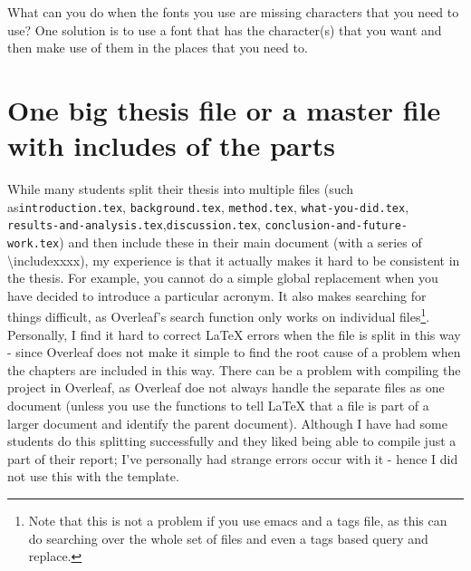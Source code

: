 \documentclass[main.tex]{subfiles}
\begin{document}
What can you do when the fonts you use are missing characters that you need to use? One solution is to use a font that has the character(s) that you want and then make use of them in the places that you need to.


\section{One big thesis file or a master file with includes of the parts}
\label{sec:onebigFIlevsincludes}

While many students split their thesis into multiple files (such as\linebreak[4] \texttt{introduction.tex}, \texttt{background.tex}, \texttt{method.tex}, \linebreak[4]\texttt{what-you-did.tex}, \texttt{results-and-analysis.tex},\linebreak[4] \texttt{discussion.tex}, \texttt{conclusion-and-future-work.tex}) and then include these in their main document (with a series of \textbackslash include{xxxx}), my experience is that it actually makes it hard to be consistent in the thesis. For example, you cannot do a simple global replacement when you have decided to introduce a particular acronym. It also makes searching for things difficult, as Overleaf's search function only works on individual files\footnote{Note that this is not a problem if you use emacs and a tags file, as this can do searching over the whole set of files and even a tags based query and replace.}. Personally, I find it hard to correct LaTeX errors when the file is split in this way - since Overleaf does not make it simple to find the root cause of a problem when the chapters are included in this way. There can be a problem with compiling the project in Overleaf, as Overleaf doe not always handle the separate files as one document (unless you use the functions to tell LaTeX that a file is part of a larger document and identify the parent document). Although I have had some students do this splitting successfully and they liked being able to compile just a part of their report; I've personally had strange errors occur with it - hence I did not use this with the template.
\end{document}
